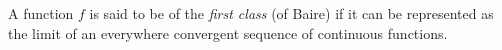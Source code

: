 A function $f$ is said to be of the \emph{first class} (of Baire) if it can be represented as the limit of an everywhere convergent sequence of continuous functions.
